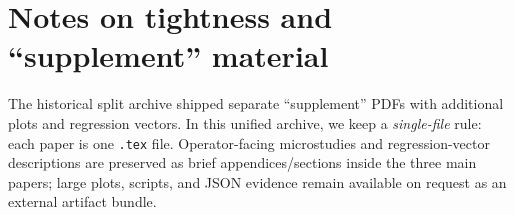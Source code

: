 \documentclass[11pt]{article}
\begin{document}
\section*{Notes on tightness and ``supplement'' material}
The historical split archive shipped separate ``supplement'' PDFs with additional plots and regression vectors.
In this unified archive, we keep a \emph{single-file} rule: each paper is one \texttt{.tex} file.
Operator-facing microstudies and regression-vector descriptions are preserved as brief appendices/sections inside the three main papers;
large plots, scripts, and JSON evidence remain available on request as an external artifact bundle.
\end{document}
